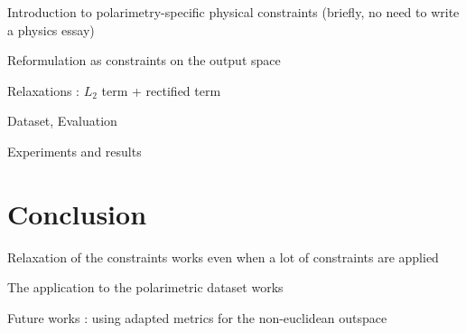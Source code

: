 Introduction to polarimetry-specific physical constraints (briefly, no need to write a physics essay)

Reformulation as constraints on the output space

Relaxations : $L_2$ term + rectified term

Dataset, Evaluation

Experiments and results

\section{Conclusion}

Relaxation of the constraints works even when a lot of constraints are applied

The application to the polarimetric dataset works

Future works : using adapted metrics for the non-euclidean outspace